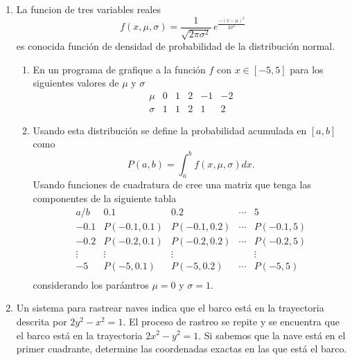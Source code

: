 \documentclass[letter,11pt]{article}
\begin{document}
\begin{enumerate}
\item La funcion de tres variables reales
$$
f(x,\mu,\sigma)=\frac{1}{\sqrt{2\pi\sigma^2}}\, e^{\frac{-(x-\mu)^2}{2\sigma^2}}
$$
es conocida funci\'on de densidad de probabilidad de la distribuci\'on normal.
\begin{enumerate}
    \item En un programa de \octave grafique a la funci\'on $f$ con $x\in[-5,5]$ para los siguientes valores de $\mu$ y $\sigma$
    $$
    \begin{array}{c|cccccccc}
    \mu      &  0  & 1 & 2 & -1 & -2 \\ \hline
    \sigma   &  1  & 1 & 2 & 1 & 2
    \end{array}
    $$
    \item Usando esta distribuci\'on se define la probabilidad acumulada en $[a,b]$ como
    $$
    P(a,b)=\int_a^b f(x,\mu,\sigma) dx.
    $$
    Usando funciones de cuadratura de \octave cree una matriz que tenga las componentes de la siguiente tabla
    $$
    \begin{array}{c|ccccc}
    a / b   & 0.1           & 0.2           & \cdots    & 5 \\ \hline
    -0.1    & P(-0.1,0.1)   & P(-0.1,0.2)   & \cdots    & P(-0.1,5)\\
    -0.2    & P(-0.2,0.1)   & P(-0.2,0.2)   & \cdots    & P(-0.2,5)\\ 
    \vdots  & \vdots        & \vdots        &           & \vdots\\
    -5      & P(-5,0.1)     & P(-5,0.2)     & \cdots    & P(-5,5)\\
    \end{array}
    $$
    considerando los par\'amtros $\mu=0$ y $\sigma=1$.

\end{enumerate}

\item Un sistema para rastrear naves indica que el barco est\'a en la trayectoria descrita por
$2y^2-x^2=1$. El proceso de rastreo se repite y se encuentra que el barco est\'a en la trayectoria
$2x^2-y^2=1$. Si sabemos que la nave est\'a en el primer cuadrante, determine las coordenadas exactas en las que est\'a el barco.
\end{enumerate}
\end{document}
